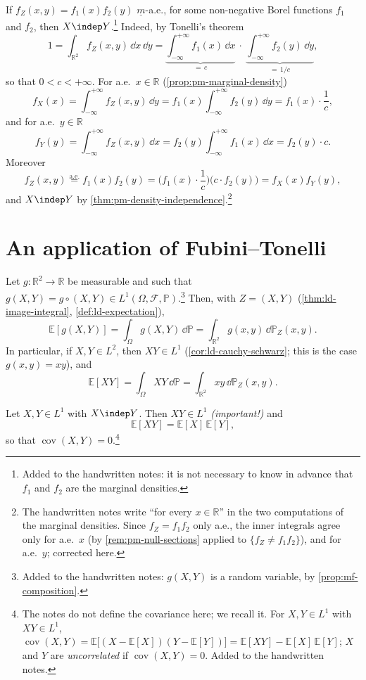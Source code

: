 \begin{remark}\label{rem:pm-factorisation}
If $f_Z(x,y)=f_1(x)f_2(y)$ $\underline m$-a.e., for some non-negative Borel functions $f_1$ and
$f_2$, then $X\indep Y$.\footnote{Added to the handwritten notes: it is not necessary to know
in advance that $f_1$ and $f_2$ are the marginal densities.} Indeed, by Tonelli's theorem
\[
  1=\int_{\mathbb R^2}f_Z(x,y)\,\dd x\,\dd y
  =\underbrace{\int_{-\infty}^{+\infty}f_1(x)\,\dd x}_{=\,c}\ \cdot\
   \underbrace{\int_{-\infty}^{+\infty}f_2(y)\,\dd y}_{=\,1/c},
\]
so that $0<c<+\infty$. For a.e.\ $x\in\mathbb R$ (\cref{prop:pm-marginal-density})
\[
  f_X(x)=\int_{-\infty}^{+\infty}f_Z(x,y)\,\dd y=f_1(x)\int_{-\infty}^{+\infty}f_2(y)\,\dd y=f_1(x)\cdot\frac1c,
\]
and for a.e.\ $y\in\mathbb R$
\[
  f_Y(y)=\int_{-\infty}^{+\infty}f_Z(x,y)\,\dd x=f_2(y)\int_{-\infty}^{+\infty}f_1(x)\,\dd x=f_2(y)\cdot c .
\]
Moreover
\[
  f_Z(x,y)\overset{\text{a.e.}}{=}f_1(x)f_2(y)=\Big(f_1(x)\cdot\frac1c\Big)\big(c\cdot f_2(y)\big)=f_X(x)f_Y(y),
\]
and $X\indep Y$ by \cref{thm:pm-density-independence}.\footnote{The handwritten notes write
``for every $x\in\mathbb R$'' in the two computations of the marginal densities. Since
$f_Z=f_1f_2$ only a.e., the inner integrals agree only for a.e.\ $x$ (by
\cref{rem:pm-null-sections} applied to $\{f_Z\ne f_1f_2\}$), and for a.e.\ $y$; corrected
here.}
\end{remark}

\section{An application of Fubini--Tonelli}\label{sec:pm-application}

Let $g:\mathbb R^2\to\mathbb R$ be measurable and such that
$g(X,Y)=g\circ(X,Y)\in L^1(\Omega,\mathcal F,\mathbb P)$.\footnote{Added to the handwritten
notes: $g(X,Y)$ is a random variable, by \cref{prop:mf-composition}.} Then, with $Z=(X,Y)$ (\cref{thm:ld-image-integral},
\cref{def:ld-expectation}),
\[
  \mathbb E[g(X,Y)]=\int_\Omega g(X,Y)\,\dd\mathbb P=\int_{\mathbb R^2}g(x,y)\,\dd\mathbb P_Z(x,y).
\]
In particular, if $X,Y\in L^2$, then $XY\in L^1$ (\cref{cor:ld-cauchy-schwarz}; this is the
case $g(x,y)=xy$), and
\[
  \mathbb E[XY]=\int_\Omega XY\,\dd\mathbb P=\int_{\mathbb R^2}xy\,\dd\mathbb P_Z(x,y).
\]

\begin{proposition}\label{thm:pm-expectation-product}
Let $X,Y\in L^1$ with $X\indep Y$. Then $XY\in L^1$ \emph{(important!)} and
\[
  \mathbb E[XY]=\mathbb E[X]\,\mathbb E[Y],
\]
so that $\operatorname{cov}(X,Y)=0$.\footnote{The notes do not define the covariance here; we
recall it. For $X,Y\in L^1$ with $XY\in L^1$, $\operatorname{cov}(X,Y)=\mathbb E\big[(X-\mathbb
E[X])(Y-\mathbb E[Y])\big]=\mathbb E[XY]-\mathbb E[X]\,\mathbb E[Y]$; $X$ and $Y$ are
\emph{uncorrelated} if $\operatorname{cov}(X,Y)=0$. Added to the handwritten notes.}
\end{proposition}

